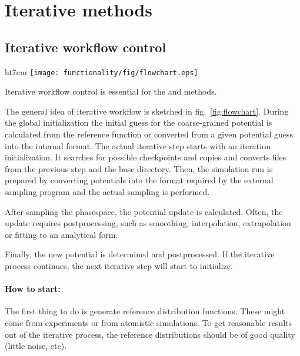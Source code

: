 \chapter{Iterative methods}
\label{sec:iterative_methods}

\section{Iterative workflow control}
\label{sec:iterative_workflow}

\begin{wrapfigure}{ht}{7cm}
\texttt{[image: functionality/fig/flowchart.eps]}
  \caption{
    \label{fig:flowchart}
    Block-scheme of the workflow control for the iterative methods. The most time-consuming parts are marked in red.
  }
\end{wrapfigure}
Iterative workflow control is essential for the \ibi and \imc methods.

The general idea of iterative workflow is sketched in fig.~\ref{fig:flowchart}. During the global initialization the initial guess for the coarse-grained potential is calculated from the reference function or converted from a given potential guess into the internal format. The actual iterative step starts with an iteration initialization. It searches for possible checkpoints and copies and converts files from the previous step and the base directory. Then, the simulation run is prepared by converting potentials into the format required by the external sampling program and the actual sampling is performed. 

After sampling the phasespace, the potential update is calculated. Often, the update requires postprocessing, such as smoothing, interpolation, extrapolation or fitting to an analytical form.

Finally, the new potential is determined and postprocessed. If the iterative process continues, the next iterative step will start to initialize.

\subsubsection*{How to start:}

The first thing to do is generate reference distribution functions. These might come from experiments or from atomistic simulations. To get reasonable results out of the iterative process, the reference distributions should be of good quality (little noise, etc).

